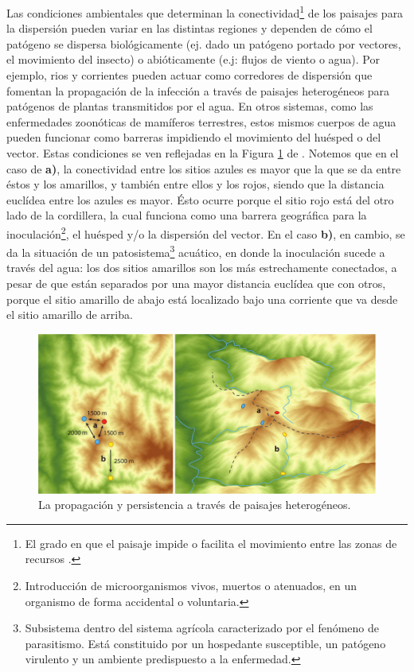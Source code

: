 \par Las condiciones ambientales que determinan la
  conectividad\footnote{El grado en que el paisaje impide o facilita el movimiento
  entre las zonas de recursos \cite{landscape_connectivity}.} de los paisajes
  para la dispersión pueden variar en las distintas regiones y dependen de cómo
  el patógeno se dispersa biológicamente (ej. dado un patógeno portado por
  vectores, el movimiento del insecto) o abióticamente (e.j: flujos de viento o agua).
  Por ejemplo, rios y corrientes pueden actuar como corredores de dispersión que
  fomentan la propagación de la infección a través de paisajes heterogéneos
  para patógenos de plantas transmitidos por el agua. En otros
  sistemas, como las enfermedades zoonóticas de mamíferos terrestres, estos mismos
  cuerpos de agua pueden funcionar como barreras impidiendo el movimiento
  del huésped o del vector. Estas condiciones se ven reflejadas en la
  Figura \ref{fig:paisajes_h} de \cite{landscape_epidemiology}.
  Notemos que en el caso de \textbf{a)}, la
  conectividad entre los sitios azules es mayor que la que se da entre éstos y
  los amarillos, y también entre ellos y los rojos, siendo que la distancia
  euclídea entre los azules es mayor. Ésto ocurre porque el sitio rojo está del otro lado
  de la cordillera, la cual funciona como una barrera geográfica para la
  inoculación\footnote{Introducción de microorganismos vivos, muertos o atenuados,
  en un organismo de forma accidental o voluntaria.}, el huésped y/o la dispersión
  del vector. En el caso \textbf{b)}, en cambio, se da la situación de un
  patosistema\footnote{Subsistema dentro del sistema agrícola caracterizado por el
  fenómeno de parasitismo. Está constituido por un hospedante susceptible,
  un patógeno virulento y un ambiente predispuesto a la enfermedad.} acuático, en
  donde la inoculación sucede a través del agua: los dos sitios amarillos son los
  más estrechamente conectados, a pesar de que están separados por una mayor
  distancia euclídea que con otros, porque el sitio amarillo de abajo está localizado
  bajo una corriente que va desde el sitio amarillo de arriba.


    \begin{figure}
    \centering%
    \includegraphics[width=1\textwidth]{images/paisajes_heterogeneos}%
    \caption{La propagación y persistencia a través de paisajes heterogéneos.}\label{fig:paisajes_h}
    \end{figure}

